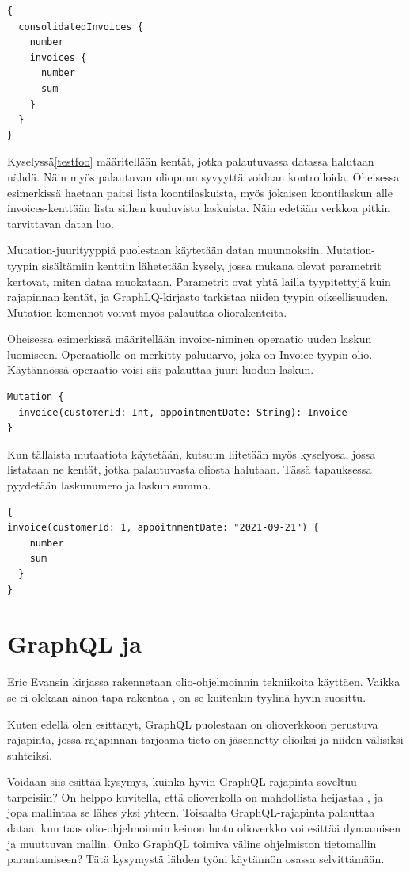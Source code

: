 \begin{verbatim}
{
  consolidatedInvoices {
    number
    invoices {
      number
      sum
    }
  }
}
\end{verbatim}

Kyselyssä\ref{testfoo} määritellään kentät, jotka palautuvassa datassa
halutaan nähdä. Näin myös palautuvan oliopuun syvyyttä voidaan
kontrolloida. Oheisessa esimerkissä haetaan paitsi lista
koontilaskuista, myös jokaisen koontilaskun alle invoices-kenttään lista
siihen kuuluvista laskuista. Näin edetään verkkoa pitkin tarvittavan
datan luo.

Mutation-juurityyppiä puolestaan käytetään datan muunnoksiin.
Mutation-tyypin sisältämiin kenttiin lähetetään kysely, jossa mukana
olevat parametrit kertovat, miten dataa muokataan. Parametrit ovat yhtä
lailla tyypitettyjä kuin rajapinnan kentät, ja GraphLQ-kirjasto
tarkistaa niiden tyypin oikeellisuuden. Mutation-komennot voivat myös
palauttaa oliorakenteita.

Oheisessa esimerkissä määritellään invoice-niminen operaatio uuden
laskun luomiseen. Operaatiolle on merkitty paluuarvo, joka on
Invoice-tyypin olio. Käytännössä operaatio voisi siis palauttaa juuri
luodun laskun.

\begin{verbatim}
Mutation {
  invoice(customerId: Int, appointmentDate: String): Invoice
}
\end{verbatim}

Kun tällaista mutaatiota käytetään, kutsuun liitetään myös kyselyosa,
jossa listataan ne kentät, jotka palautuvasta oliosta halutaan. Tässä
tapauksessa pyydetään laskunumero ja laskun summa.

\begin{verbatim}
{
invoice(customerId: 1, appoitnmentDate: "2021-09-21") {
    number
    sum
  }
}
\end{verbatim}

\hypertarget{graphql-ja}{%
\section{\texorpdfstring{GraphQL ja
}{GraphQL ja }}\label{graphql-ja}}

Eric Evansin kirjassa  rakennetaan
olio-ohjelmoinnin tekniikoita käyttäen. Vaikka se ei olekaan ainoa tapa
rakentaa , on se kuitenkin tyylinä hyvin
suosittu.

Kuten edellä olen esittänyt, GraphQL puolestaan on olioverkkoon
perustuva rajapinta, jossa rajapinnan tarjoama tieto on jäsennetty
olioiksi ja niiden välisiksi suhteiksi.

Voidaan siis esittää kysymys, kuinka hyvin GraphQL-rajapinta soveltuu
 tarpeisiin? On helppo kuvitella, että olioverkolla on
mahdollista heijastaa , ja jopa mallintaa se
lähes yksi yhteen. Toisaalta GraphQL-rajapinta palauttaa dataa, kun taas
olio-ohjelmoinnin keinon luotu olioverkko voi esittää dynaamisen ja
muuttuvan mallin. Onko GraphQL toimiva väline ohjelmiston tietomallin
parantamiseen? Tätä kysymystä lähden työni käytännön osassa
selvittämään.
